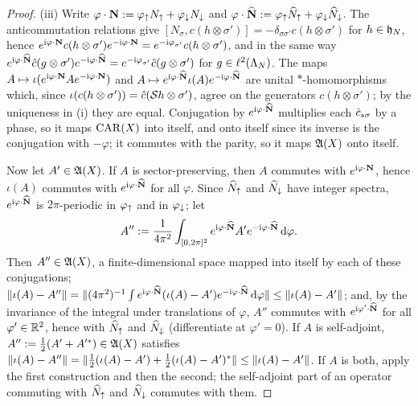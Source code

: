 \begin{proof}
(iii) Write $\varphi\cdot\mathbf N:=\varphi_{\uparrow}N_{\uparrow}+\varphi_{\downarrow}N_{\downarrow}$ and $\varphi\cdot\widehat{\mathbf N}:=\varphi_{\uparrow}\widehat{N}_{{\uparrow}}+\varphi_{\downarrow}\widehat{N}_{{\downarrow}}$.
The anticommutation relations give $[N_\sigma,c(h\otimes\sigma')]=-\delta_{\sigma\sigma'}c(h\otimes\sigma')$ for
$h\in\mathfrak{h}_N$, hence $e^{\mathrm{i}\varphi\cdot\mathbf N}c(h\otimes\sigma')e^{-\mathrm{i}\varphi\cdot\mathbf N}=e^{-\mathrm{i}\varphi_{\sigma'}}c(h\otimes\sigma')$, and
in the same way $e^{\mathrm{i}\varphi\cdot\widehat{\mathbf N}}\hat{c}(g\otimes\sigma')e^{-\mathrm{i}\varphi\cdot\widehat{\mathbf N}}=e^{-\mathrm{i}\varphi_{\sigma'}}\hat{c}(g\otimes\sigma')$
for $g\in\ell^2(\Lambda_N)$. The maps $A\mapsto\iota(e^{\mathrm{i}\varphi\cdot\mathbf N}Ae^{-\mathrm{i}\varphi\cdot\mathbf N})$ and
$A\mapsto e^{\mathrm{i}\varphi\cdot\widehat{\mathbf N}}\iota(A)e^{-\mathrm{i}\varphi\cdot\widehat{\mathbf N}}$ are unital $*$-homomorphisms which,
since $\iota(c(h\otimes\sigma'))=\hat{c}(\mathcal{S} h\otimes\sigma')$, agree on the generators $c(h\otimes\sigma')$; by the
uniqueness in (i) they are equal. Conjugation by $e^{\mathrm{i}\varphi\cdot\widehat{\mathbf N}}$ multiplies each $\hat{c}_{s\sigma}$ by
a phase, so it maps $\mathrm{CAR}(X)$ into itself, and onto itself since its inverse is the conjugation with $-\varphi$; it
commutes with the parity, so it maps $\mathfrak{A}(X)$ onto itself.

Now let $A'\in\mathfrak{A}(X)$. If $A$ is sector-preserving, then $A$ commutes with $e^{\mathrm{i}\varphi\cdot\mathbf N}$, hence
$\iota(A)$ commutes with $e^{\mathrm{i}\varphi\cdot\widehat{\mathbf N}}$ for all $\varphi$. Since $\widehat{N}_{{\uparrow}}$ and $\widehat{N}_{{\downarrow}}$ have integer
spectra, $e^{\mathrm{i}\varphi\cdot\widehat{\mathbf N}}$ is $2\pi$-periodic in $\varphi_{\uparrow}$ and in $\varphi_{\downarrow}$; let
\[
A'':=\frac1{4\pi^2}\int_{[0,2\pi]^2}e^{\mathrm{i}\varphi\cdot\widehat{\mathbf N}}A'e^{-\mathrm{i}\varphi\cdot\widehat{\mathbf N}}\,\mathrm{d}\varphi .
\]
Then $A''\in\mathfrak{A}(X)$, a finite-dimensional space mapped into itself by each of these conjugations;
$\lVert\iota(A)-A''\rVert=\lVert(4\pi^2)^{-1}\int e^{\mathrm{i}\varphi\cdot\widehat{\mathbf N}}(\iota(A)-A')e^{-\mathrm{i}\varphi\cdot\widehat{\mathbf N}}\,\mathrm{d}\varphi\rVert\le\lVert\iota(A)-A'\rVert$;
and, by the invariance of the integral under translations of $\varphi$, $A''$ commutes with
$e^{\mathrm{i}\varphi'\cdot\widehat{\mathbf N}}$ for all $\varphi'\in\mathbb{R}^2$, hence with $\widehat{N}_{{\uparrow}}$ and $\widehat{N}_{{\downarrow}}$ (differentiate at
$\varphi'=0$). If $A$ is self-adjoint, $A'':=\frac12(A'+A'^*)\in\mathfrak{A}(X)$ satisfies
$\lVert\iota(A)-A''\rVert=\lVert\frac12(\iota(A)-A')+\frac12(\iota(A)-A')^*\rVert\le\lVert\iota(A)-A'\rVert$. If $A$ is both, apply the
first construction and then the second; the self-adjoint part of an operator commuting with $\widehat{N}_{{\uparrow}}$ and
$\widehat{N}_{{\downarrow}}$ commutes with them.
\end{proof}


